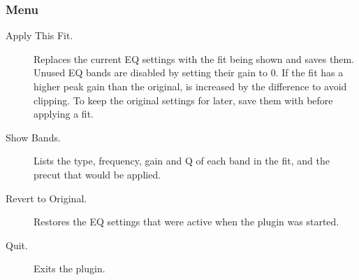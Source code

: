 \subsubsection{Menu}
\begin{description}
    \item[Apply This Fit.] Replaces the current EQ settings with the fit
        being shown and saves them.  Unused EQ bands are disabled by setting
        their gain to 0.  If the fit has a higher peak gain than the
        original,  is increased by the difference to avoid
        clipping.  To keep the original settings for later, save them with
         before applying a fit.
    \item[Show Bands.] Lists the type, frequency, gain and Q of each band in
        the fit, and the precut that would be applied.
    \item[Revert to Original.] Restores the EQ settings that were active when
        the plugin was started.
    \item[Quit.] Exits the plugin.
\end{description}
